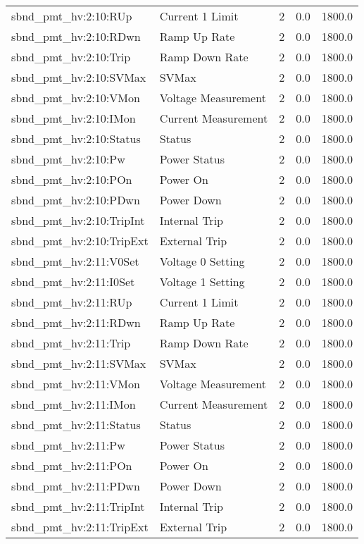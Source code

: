 \begin{center}
\begin{longtable}{l | l l l l }
sbnd\_pmt\_hv:2:10:RUp & Current 1 Limit & 2 & 0.0 & 1800.0\\ 
sbnd\_pmt\_hv:2:10:RDwn & Ramp Up Rate & 2 & 0.0 & 1800.0\\ 
sbnd\_pmt\_hv:2:10:Trip & Ramp Down Rate & 2 & 0.0 & 1800.0\\ 
sbnd\_pmt\_hv:2:10:SVMax & SVMax & 2 & 0.0 & 1800.0\\ 
sbnd\_pmt\_hv:2:10:VMon & Voltage Measurement & 2 & 0.0 & 1800.0\\ 
sbnd\_pmt\_hv:2:10:IMon & Current Measurement & 2 & 0.0 & 1800.0\\ 
sbnd\_pmt\_hv:2:10:Status & Status & 2 & 0.0 & 1800.0\\ 
sbnd\_pmt\_hv:2:10:Pw & Power Status & 2 & 0.0 & 1800.0\\ 
sbnd\_pmt\_hv:2:10:POn & Power On & 2 & 0.0 & 1800.0\\ 
sbnd\_pmt\_hv:2:10:PDwn & Power Down & 2 & 0.0 & 1800.0\\ 
sbnd\_pmt\_hv:2:10:TripInt & Internal Trip & 2 & 0.0 & 1800.0\\ 
sbnd\_pmt\_hv:2:10:TripExt & External Trip & 2 & 0.0 & 1800.0\\ 
sbnd\_pmt\_hv:2:11:V0Set & Voltage 0 Setting & 2 & 0.0 & 1800.0\\ 
sbnd\_pmt\_hv:2:11:I0Set & Voltage 1 Setting & 2 & 0.0 & 1800.0\\ 
sbnd\_pmt\_hv:2:11:RUp & Current 1 Limit & 2 & 0.0 & 1800.0\\ 
sbnd\_pmt\_hv:2:11:RDwn & Ramp Up Rate & 2 & 0.0 & 1800.0\\ 
sbnd\_pmt\_hv:2:11:Trip & Ramp Down Rate & 2 & 0.0 & 1800.0\\ 
sbnd\_pmt\_hv:2:11:SVMax & SVMax & 2 & 0.0 & 1800.0\\ 
sbnd\_pmt\_hv:2:11:VMon & Voltage Measurement & 2 & 0.0 & 1800.0\\ 
sbnd\_pmt\_hv:2:11:IMon & Current Measurement & 2 & 0.0 & 1800.0\\ 
sbnd\_pmt\_hv:2:11:Status & Status & 2 & 0.0 & 1800.0\\ 
sbnd\_pmt\_hv:2:11:Pw & Power Status & 2 & 0.0 & 1800.0\\ 
sbnd\_pmt\_hv:2:11:POn & Power On & 2 & 0.0 & 1800.0\\ 
sbnd\_pmt\_hv:2:11:PDwn & Power Down & 2 & 0.0 & 1800.0\\ 
sbnd\_pmt\_hv:2:11:TripInt & Internal Trip & 2 & 0.0 & 1800.0\\ 
sbnd\_pmt\_hv:2:11:TripExt & External Trip & 2 & 0.0 & 1800.0\\ 

\end{longtable}
\end{center}
